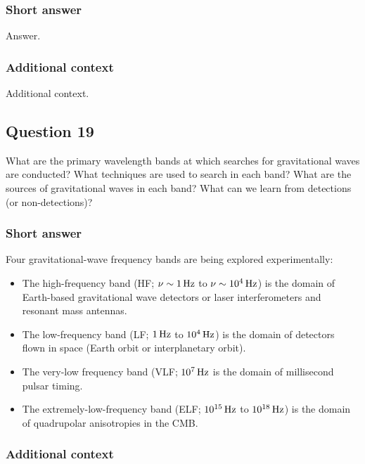 \documentclass[a4paper,10pt]{article}
\begin{document}
\subsubsection{Short answer}

Answer.

\subsubsection{Additional context}

Additional context.


\newpage
\subsection{Question 19}

What are the primary wavelength bands at which searches for gravitational waves are conducted? What techniques are used to search in each band? What are the sources of gravitational waves in each band? What can we learn from detections (or non-detections)?

\subsubsection{Short answer}

Four gravitational-wave frequency bands are being explored experimentally:

\begin{itemize}
    \item The high-frequency band (HF; $\nu\sim1\,{\rm Hz}$ to $\nu\sim10^4\,{\rm Hz}$) is the domain of Earth-based gravitational wave detectors or laser interferometers and resonant mass antennas.
    \item The low-frequency band (LF; $1\,{\rm Hz}$ to $10^4\,{\rm Hz}$) is the domain of detectors flown in space (Earth orbit or interplanetary orbit).
    \item The very-low frequency band (VLF; $10^7\,{\rm Hz}$ is the domain of millisecond pulsar timing.
    \item The extremely-low-frequency band (ELF; $10^{15}\,{\rm Hz}$ to $10^{18}\,{\rm Hz}$) is the domain of quadrupolar anisotropies in the CMB.
\end{itemize}

\subsubsection{Additional context}
\end{document}
